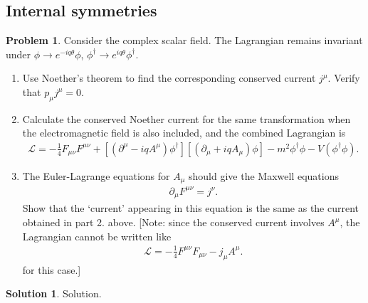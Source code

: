 \documentclass[a4paper,11pt]{article}
\numberwithin{equation}{section}
\theoremstyle{definition}
\newtheorem{prob}{Problem}[section]
\newtheorem{sln}{Solution}[section]
\newcommand{\p}{\partial}
\newcommand{\lag}{\mathcal{L}}
\begin{document}
\newpage

\subsection{Internal symmetries}

\begin{prob}
	Consider the complex scalar field. The Lagrangian remains invariant under $\phi\to e^{-iq\theta}\phi$, $\phi^\dagger \to e^{iq\theta}\phi^\dagger$. 
	\begin{enumerate}
		\item Use Noether's theorem to find the corresponding conserved current $j^\mu$. Verify that $p_\mu j^\mu = 0$.
		\item Calculate the conserved Noether current for the same transformation when the electromagnetic field is also included, and the combined Lagrangian is
		\begin{align}
		\lag = -\frac{1}{4}F_{\mu\nu}F^{\mu\nu} + \left[(\p^\mu -iq A^\mu)\phi^\dagger \right]\left[(\p_\mu + iq A_\mu)\phi\right] - m^2\phi^\dagger\phi - V(\phi^\dagger\phi).
		\end{align}
		\item The Euler-Lagrange equations for $A_\mu$ should give the Maxwell equations
		\begin{align}
		\p_\mu F^{\mu\nu} = j^\nu.
		\end{align}
		Show that the `current' appearing in this equation is the same as the current obtained in part 2. above. [Note: since the conserved current involves $A^\mu$, the Lagrangian cannot be written like
		\begin{align}
		\lag = -\frac{1}{4}F^{\mu\nu}F_{\mu\nu} - j_\mu A^\mu.
		\end{align}
		for this case.]\\
	\end{enumerate}

	\begin{sln}
		Solution.
	\end{sln}
\end{prob}




















\newpage
\end{document}
